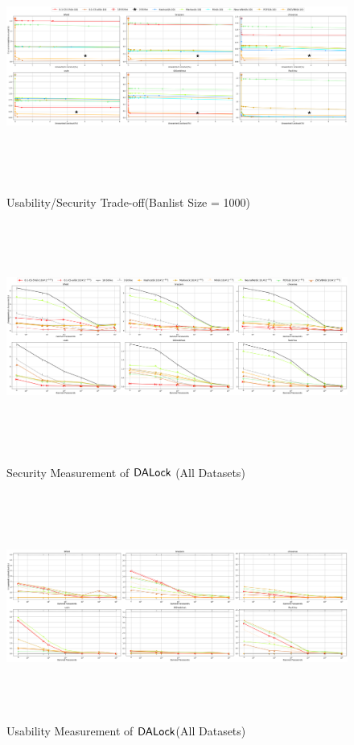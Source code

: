 	\begin{figure}
		\includegraphics[width=\linewidth, height = 7.5cm]{Figures/Experiments/B1000.png}
		\vspace{-0.2in}
		\caption[Usability/Security Trade-off]{Usability/Security Trade-off(Banlist Size = 1000)}
		\label{fig:secuseB1000}
		\includegraphics[width=\linewidth, height = 7.5cm]{Figures/Experiments/Attacker/SecurityBigPictureFull}
		\vspace{-0.2in}
		\caption{Security Measurement of $\mathsf{DALock}$ (All Datasets)}
		\label{fig:securitydpcomparefull}	
		\includegraphics[width=\linewidth, height = 7.5cm]{Figures/Experiments/Utility/UsabilityBigPictureFull}
		\vspace{-0.2in}
		\caption{Usability Measurement of $\mathsf{DALock}$(All Datasets)}
		\label{fig:usabilitydpcomparefull}	
	\end{figure}
	

